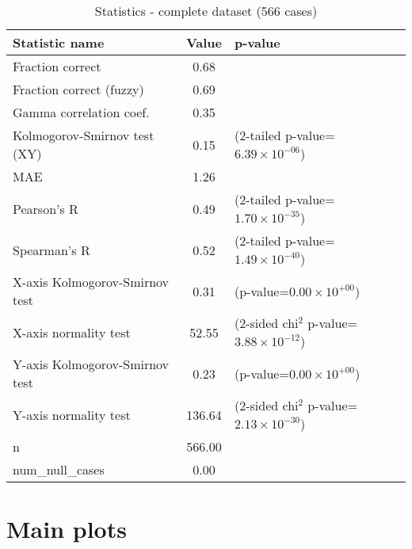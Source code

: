 \documentclass[10pt, letterpaper, oneside, titlepage, landscape]{scrreprt}
\begin{document}
\begin{table}[H]\begin{center}
\begin{tabular}{ l S[table-format=3.2] l}
Statistic name & {Value} & p-value\\
\hline
Fraction correct & 0.68 & \\
Fraction correct (fuzzy) & 0.69 & \\
Gamma correlation coef. & 0.35 & \\
Kolmogorov-Smirnov test (XY) & 0.15 & (2-tailed p-value=$6.39\times10^{-06}$)\\
MAE & 1.26 & \\
Pearson's R & 0.49 & (2-tailed p-value=$1.70\times10^{-35}$)\\
Spearman's R & 0.52 & (2-tailed p-value=$1.49\times10^{-40}$)\\
X-axis Kolmogorov-Smirnov test & 0.31 & (p-value=$0.00\times10^{+00}$)\\
X-axis normality test & 52.55 & (2-sided chi$^{2}$ p-value=$3.88\times10^{-12}$)\\
Y-axis Kolmogorov-Smirnov test & 0.23 & (p-value=$0.00\times10^{+00}$)\\
Y-axis normality test & 136.64 & (2-sided chi$^{2}$ p-value=$2.13\times10^{-30}$)\\
n & 566.00 & \\
num\_null\_cases & 0.00 & \\
\end{tabular}
\caption{Statistics - complete dataset (566 cases)}
\end{center}\end{table}



\clearpage

\section{Main plots}
\end{document}
